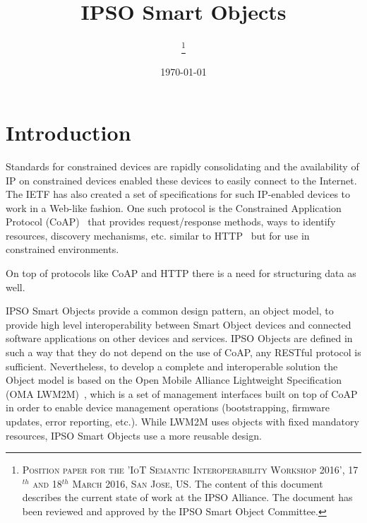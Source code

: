 \documentclass[peerreview, a4paper, 7pt]{IEEEtran}
\begin{document}
\title{IPSO Smart Objects}

\author{
\thanks{\textsc{Position paper for the 'IoT Semantic Interoperability Workshop 2016', 17$^{th}$ and 18$^{th}$ March 2016, San Jose, US.} The content of this document describes the current state of work at the IPSO Alliance. The document has been reviewed and approved by the IPSO Smart Object Committee.}
}

\date{\today}

\maketitle


\section{Introduction}

Standards for constrained devices are rapidly consolidating and the availability of IP on constrained devices enabled these devices to easily connect to the Internet. The IETF has also created a set of specifications for such IP-enabled devices to work in a Web-like fashion. One such protocol is the Constrained Application Protocol (CoAP)~\cite{rfc7252} that provides request/response methods, ways to identify resources, discovery mechanisms, etc. similar to HTTP~\cite{rfc2616} but for use in constrained environments.

On top of protocols like CoAP and HTTP there is a need for structuring data as well.

IPSO Smart Objects provide a common design pattern, an object model, to provide high level interoperability between Smart Object devices and connected software applications on other devices and services. IPSO Objects are defined in such a way that they do not depend on the use of CoAP, any RESTful protocol is sufficient. Nevertheless, to develop a complete and interoperable solution the Object model is based on the Open Mobile Alliance Lightweight Specification (OMA LWM2M)~\cite{lwm2m}, which is a set of management interfaces built on top of CoAP in order to enable device management operations (bootstrapping, firmware updates, error reporting, etc.). While LWM2M uses objects with fixed mandatory resources, IPSO Smart Objects use a more reusable design. 
\end{document}
